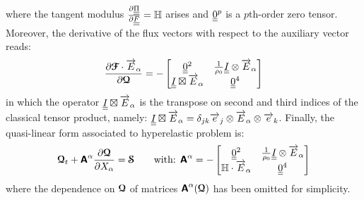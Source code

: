 where the tangent modulus $\drond{\tens{\Pi}}{\tens{F}}=\Hbb$ arises and $\tens{0}^p$ is a $p$th-order zero tensor. Moreover, the derivative of the flux vectors with respect to the auxiliary vector reads:
\begin{equation}
  \drond{\Fcb\cdot\vect{E}_\alpha}{\Qcb}=-\matrice{\tens{0}^2 & \frac{1}{\rho_0}\tens{I}\otimes\vect{E}_\alpha \\    \tens{I}\boxtimes \vect{E}_\alpha & \tens{0}^4}
\end{equation}
in which the operator $\tens{I}\boxtimes\vect{E}_\alpha$ is the transpose on second and third indices of the classical tensor product, namely: $\tens{I}\boxtimes\vect{E}_\alpha=\delta_{jk} \vect{e}_j\otimes \vect{E}_\alpha\otimes\vect{e}_k$.
Finally, the quasi-linear form associated to hyperelastic problem is:
\begin{equation}
  \Qcb_t + \Absf^\alpha \drond{\Qcb}{X_\alpha} = \Scb \qquad \text{with: }\Absf^\alpha = -\matrice{ \tens{0}^2 & \frac{1}{\rho_0}\tens{I}\otimes\vect{E}_\alpha \\ \Hbb\cdot\vect{E}_\alpha & \tens{0}^4} \label{eq:HE_quasilinear}
\end{equation}
where the dependence on $\Qcb$ of matrices $\Absf^\alpha(\Qcb)$ has been omitted for simplicity.

